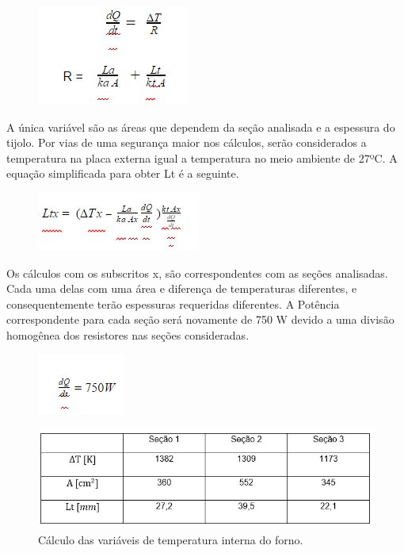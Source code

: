 \begin{figure}[!h]
	\centering
	\label{form4}
	\includegraphics[keepaspectratio=true,scale=1.0]{figuras/form4.JPG}
\end{figure}

 A única variável são as áreas que dependem da seção analisada e a espessura do tijolo. Por vias de uma segurança maior nos cálculos, serão considerados a temperatura na placa externa igual a temperatura no meio ambiente de 27ºC. A equação simplificada para obter Lt é a seguinte.
 
\begin{figure}[!h]
	\centering
	\label{form5}
	\includegraphics[keepaspectratio=true,scale=1.0]{figuras/form5.JPG}
\end{figure}
 
Os cálculos com os subscritos x, são correspondentes com as seções analisadas. Cada uma delas com uma área e diferença de temperaturas diferentes, e consequentemente terão espessuras requeridas diferentes. A Potência correspondente para cada seção será novamente de 750 W devido a uma divisão homogênea dos resistores nas seções consideradas.
 
\begin{figure}[!h]
	\centering
	\label{form6}
	\includegraphics[keepaspectratio=true,scale=1.0]{figuras/form6.JPG}
\end{figure}

\begin{figure}[!h]
	\centering
	\label{tab}
	\includegraphics[keepaspectratio=true,scale=1.0]{figuras/tab.JPG}
	\caption{Cálculo das variáveis de temperatura interna do forno.}
\end{figure}

